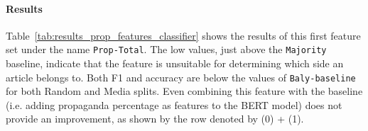


\paragraph{Results}
Table~\ref{tab:results_prop_features_classifier} shows the results of this first feature set under the name \texttt{Prop-Total}. The low values, just above the \texttt{Majority} baseline, indicate that the feature is unsuitable for determining which side an article belongs to. Both F1 and accuracy are below the values of \texttt{Baly-baseline} for both Random and Media splits. Even combining this feature with the baseline (i.e. adding propaganda percentage as features to the BERT model) does not provide an improvement, as shown by the row denoted by (0) + (1).




